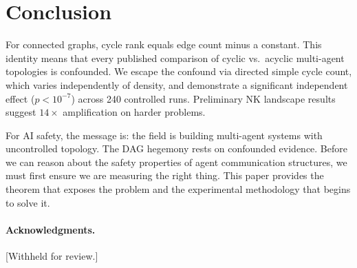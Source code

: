 \documentclass[10pt,twocolumn]{article}
\begin{document}
\section{Conclusion}
\label{sec:conclusion}

For connected graphs, cycle rank equals edge count minus a constant. This
identity means that every published comparison of cyclic vs.\ acyclic
multi-agent topologies is confounded. We escape the confound via directed
simple cycle count, which varies independently of density, and demonstrate
a significant independent effect ($p < 10^{-7}$) across 240 controlled
runs. Preliminary NK landscape results suggest $14\times$ amplification on
harder problems.

For AI safety, the message is: the field is building multi-agent systems
with uncontrolled topology. The DAG hegemony rests on confounded evidence.
Before we can reason about the safety properties of agent communication
structures, we must first ensure we are measuring the right thing. This
paper provides the theorem that exposes the problem and the experimental
methodology that begins to solve it.

\paragraph{Acknowledgments.} [Withheld for review.]

\end{document}
